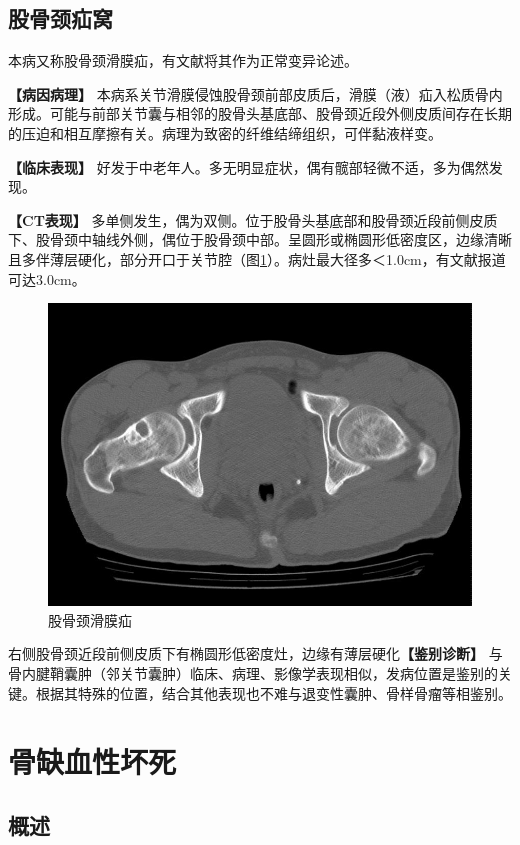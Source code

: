 \subsection{股骨颈疝窝}

本病又称股骨颈滑膜疝，有文献将其作为正常变异论述。

\textbf{【病因病理】}
本病系关节滑膜侵蚀股骨颈前部皮质后，滑膜（液）疝入松质骨内形成。可能与前部关节囊与相邻的股骨头基底部、股骨颈近段外侧皮质间存在长期的压迫和相互摩擦有关。病理为致密的纤维结缔组织，可伴黏液样变。

\textbf{【临床表现】}
好发于中老年人。多无明显症状，偶有髋部轻微不适，多为偶然发现。

\textbf{【CT表现】}
多单侧发生，偶为双侧。位于股骨头基底部和股骨颈近段前侧皮质下、股骨颈中轴线外侧，偶位于股骨颈中部。呈圆形或椭圆形低密度区，边缘清晰且多伴薄层硬化，部分开口于关节腔（图\ref{fig22-35}）。病灶最大径多＜1.0cm，有文献报道可达3.0cm。

\begin{figure}[!htbp]
 \centering
 \includegraphics[width=.7\textwidth,height=\textheight,keepaspectratio]{./images/Image00461.jpg}
 \captionsetup{justification=centering}
 \caption{股骨颈滑膜疝}
 \label{fig22-35}
  \end{figure} 

右侧股骨颈近段前侧皮质下有椭圆形低密度灶，边缘有薄层硬化\textbf{【鉴别诊断】}
与骨内腱鞘囊肿（邻关节囊肿）临床、病理、影像学表现相似，发病位置是鉴别的关键。根据其特殊的位置，结合其他表现也不难与退变性囊肿、骨样骨瘤等相鉴别。

\section{骨缺血性坏死}

\subsection{概述}

